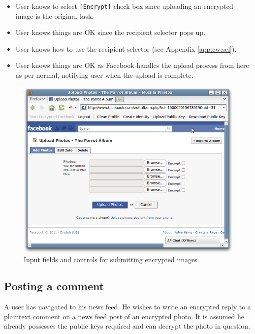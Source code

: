 \begin{desc}
\begin{itemize}
            \item User knows to select {\tt [Encrypt]} check box since uploading an encrypted image is the original task.
            
            \item User knows things are OK since the recipient selector pops up.
            
            \item User knows how to use the recipient selector (see Appendix \ref{app:cw:sel}).
            
            \item User knows things are OK as Facebook handles the upload process from here as per normal, notifying user when the upload is complete.
            
        \end{itemize}
    
\end{desc}


    \begin{figure}[tbph]
        \begin{center}
        
                \includegraphics[width=12cm]{screens/pic-upload.png}

            \caption{Input fields and controls for submitting encrypted images.}
            \label{scn:pic-up}
        \end{center}
    \end{figure}


\subsection{Posting a comment}
A user has navigated to his news feed. He wishes to write an encrypted reply to a plaintext comment on a news feed post of an encrypted photo. It is assumed he already possesses the public keys required and can decrypt the photo in question.

